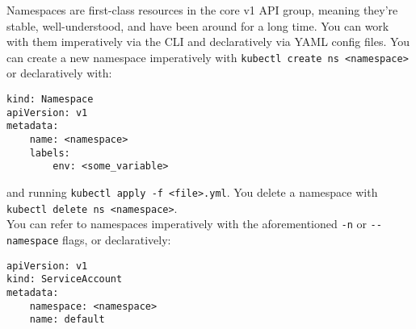 \documentclass[8pt, table, xcdraw]{article}%
\begin{document}
Namespaces are first-class resources in the core v1 API group, meaning they’re stable, well-understood, and have been around for a long time. You can work with them imperatively via the CLI and declaratively via YAML config files. You can create a new namespace imperatively with \lstinline{kubectl create ns <namespace>} or declaratively with:

\begin{lstlisting}
kind: Namespace
apiVersion: v1
metadata:
    name: <namespace>
    labels:
        env: <some_variable>
\end{lstlisting}

and running \lstinline{kubectl apply -f <file>.yml}. You delete a namespace with \lstinline{kubectl delete ns <namespace>}.\\
You can refer to namespaces imperatively with the aforementioned \lstinline{-n} or \lstinline{--namespace} flags, or declaratively:

\begin{lstlisting}
apiVersion: v1
kind: ServiceAccount
metadata:
    namespace: <namespace>
    name: default
\end{lstlisting}
\end{document}
